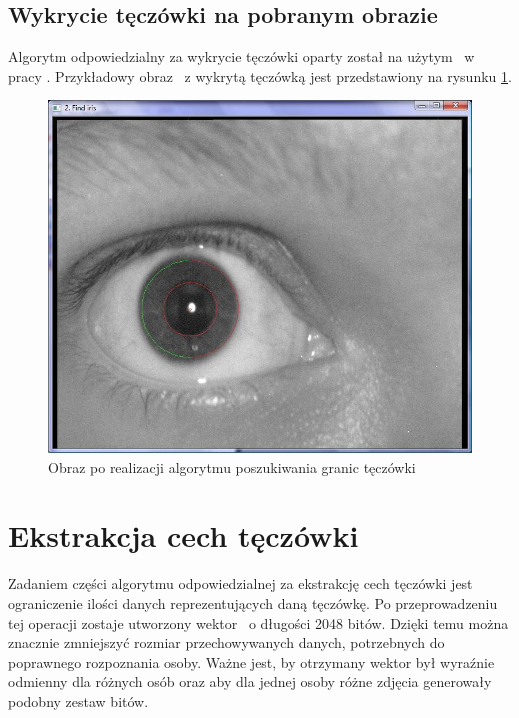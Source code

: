 \subsection{Wykrycie tęczówki na pobranym obrazie}
\label{subsec:wykrycieTeczowki}
Algorytm odpowiedzialny za wykrycie tęczówki oparty został na użytym ~w pracy \cite{Gl11}. Przykładowy obraz ~z wykrytą tęczówką jest przedstawiony na rysunku \ref{fig:teczowkaNasza}.
\begin{figure}
\begin{center}
\includegraphics[scale=0.5]{teczowka.jpg}
\caption{Obraz po realizacji algorytmu poszukiwania granic tęczówki}
\label{fig:teczowkaNasza}
\end{center}
\end{figure}

\section{Ekstrakcja cech tęczówki}
\label{sec:ekstrakcja}

Zadaniem części algorytmu odpowiedzialnej za ekstrakcję cech tęczówki jest ograniczenie ilości danych reprezentujących daną tęczówkę. Po przeprowadzeniu tej operacji zostaje utworzony wektor ~o długości 2048 bitów. Dzięki temu można znacznie zmniejszyć rozmiar przechowywanych danych, potrzebnych do poprawnego rozpoznania osoby. Ważne jest, by otrzymany wektor był wyraźnie odmienny dla różnych osób oraz aby dla jednej osoby różne zdjęcia generowały podobny zestaw bitów. 

